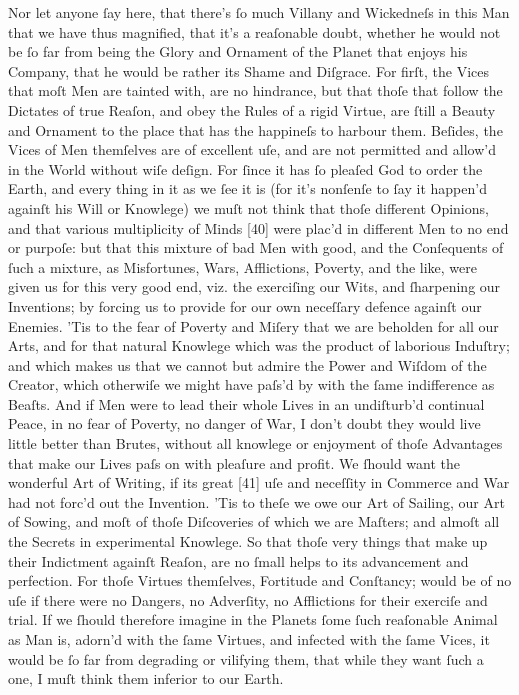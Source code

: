\documentclass[letterpaper]{book}
\begin{document}
Nor let anyone ſay here, that there's ſo much Villany and Wickedneſs in this
Man that we have thus magnified, that it's a reaſonable doubt, whether he
would not be ſo far from being the Glory and Ornament of the Planet that
enjoys his Company, that he would be rather its Shame and Diſgrace.  For
firſt, the Vices that moſt Men are tainted with, are no hindrance, but that
thoſe that follow the Dictates of true Reaſon, and obey the Rules of a rigid
Virtue, are ſtill a Beauty and Ornament to the place that has the happineſs
to harbour them. Beſides, the Vices of Men themſelves are of excellent uſe,
and are not permitted and allow'd in the World without wiſe deſign. For
ſince it has ſo pleaſed God to order the Earth, and every thing in it as we
ſee it is (for it's nonſenſe to ſay it happen'd againſt his Will or
Knowlege) we muſt not think that thoſe different Opinions, and that various
multiplicity of Minds [40] were plac'd in different Men to no end or
purpoſe: but that this mixture of bad Men with good, and the Conſequents of
ſuch a mixture, as Misfortunes, Wars, Afflictions, Poverty, and the like,
were given us for this very good end, viz. the exerciſing our Wits, and
ſharpening our Inventions; by forcing us to provide for our own neceſſary
defence againſt our Enemies.  'Tis to the fear of Poverty and Miſery that we
are beholden for all our Arts, and for that natural Knowlege which was the
product of laborious Induſtry; and which makes us that we cannot but admire
the Power and Wiſdom of the Creator, which otherwiſe we might have paſs'd by
with the ſame indifference as Beaſts. And if Men were to lead their whole
Lives in an undiſturb'd continual Peace, in no fear of Poverty, no danger of
War, I don't doubt they would live little better than Brutes, without all
knowlege or enjoyment of thoſe Advantages that make our Lives paſs on with
pleaſure and profit. We ſhould want the wonderful Art of Writing, if its
great [41] uſe and neceſſity in Commerce and War had not forc'd out the
Invention.  'Tis to theſe we owe our Art of Sailing, our Art of Sowing, and
moſt of thoſe Diſcoveries of which we are Maſters; and almoſt all the
Secrets in experimental Knowlege. So that thoſe very things that make up
their Indictment againſt Reaſon, are no ſmall helps to its advancement and
perfection. For thoſe Virtues themſelves, Fortitude and Conſtancy; would be
of no uſe if there were no Dangers, no Adverſity, no Afflictions for their
exerciſe and trial.  If we ſhould therefore imagine in the Planets ſome ſuch
reaſonable Animal as Man is, adorn'd with the ſame Virtues, and infected
with the ſame Vices, it would be ſo far from degrading or vilifying them,
that while they want ſuch a one, I muſt think them inferior to our Earth.
\end{document}
